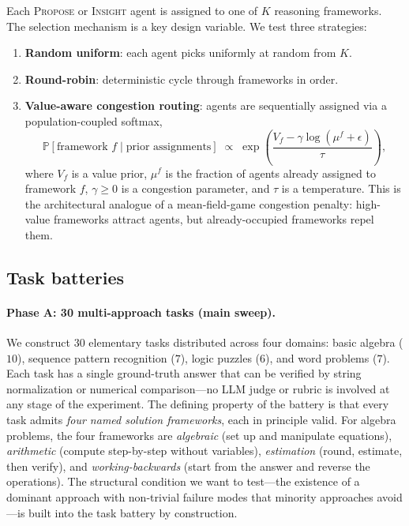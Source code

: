 \documentclass[11pt]{amsart}
\newcommand{\e}{\epsilon}
\newcommand{\g}{\gamma}
\newcommand\1{{\mathds{1}}}
\newcommand\PP{{\mathbb{P}}}
\theoremstyle{definition}
\theoremstyle{remark}
\numberwithin{equation}{section}
\begin{document}
Each \textsc{Propose} or \textsc{Insight} agent is assigned to one of $K$ reasoning frameworks.
The selection mechanism is a key design variable.
We test three strategies:
\begin{enumerate}[leftmargin=1.4em, itemsep=2pt]
\item \textbf{Random uniform}: each agent picks uniformly at random from $K$.
\item \textbf{Round-robin}: deterministic cycle through frameworks in order.
\item \textbf{Value-aware congestion routing}: agents are sequentially assigned via a population-coupled softmax,
\begin{equation}\label{eq:softmax}
\PP[\text{framework } f \mid \text{prior assignments}] \;\propto\; \exp\!\left(\frac{V_f - \g \log(\mu^f + \e)}{\tau}\right),
\end{equation}
where $V_f$ is a value prior, $\mu^f$ is the fraction of agents already assigned to framework $f$, $\g \ge 0$ is a congestion parameter, and $\tau$ is a temperature.
This is the architectural analogue of a mean-field-game congestion penalty: high-value frameworks attract agents, but already-occupied frameworks repel them.
\end{enumerate}

\subsection{Task batteries}\label{app:tasks}

\paragraph{Phase A: 30 multi-approach tasks (main sweep).}
We construct $30$ elementary tasks distributed across four domains: basic algebra ($10$), sequence pattern recognition ($7$), logic puzzles ($6$), and word problems ($7$).
Each task has a single ground-truth answer that can be verified by string normalization or numerical comparison---no LLM judge or rubric is involved at any stage of the experiment.
The defining property of the battery is that every task admits \emph{four named solution frameworks}, each in principle valid.
For algebra problems, the four frameworks are \textit{algebraic} (set up and manipulate equations), \textit{arithmetic} (compute step-by-step without variables), \textit{estimation} (round, estimate, then verify), and \textit{working-backwards} (start from the answer and reverse the operations).
The structural condition we want to test---the existence of a dominant approach with non-trivial failure modes that minority approaches avoid---is built into the task battery by construction.
\end{document}
